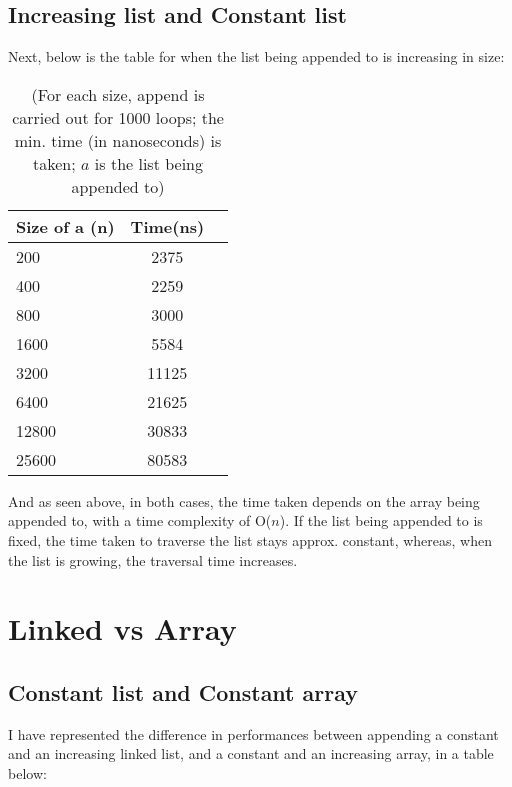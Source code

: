 \documentclass[a4paper,11pt]{article}
\begin{document}
\subsection*{Increasing list and Constant list}

Next, below is the table for when the list being appended to is increasing in size:
\begin{table}[h]
\begin{center}
\begin{tabular}{l|c|c}
\textbf{Size of a (n)} & \textbf{Time(ns)}\\
\hline
  200      &  2375\\
  400      &  2259\\
  800      &  3000\\
  1600      &  5584\\
  3200      &  11125\\
  6400      &  21625\\
  12800      &  30833\\
  25600      &  80583\\
\end{tabular}
\caption{(For each size, append is carried out for 1000 loops; the min. time (in nanoseconds) is taken; $a$ is the list being appended to)}
\label{tab:table1}
\end{center}
\end{table}

 And as seen above, in both cases, the time taken depends on the array being appended to, with a time complexity of O($n$). If the list being appended to is fixed, the time taken to traverse the list stays approx. constant, whereas, when the list is growing, the traversal time increases.


\section*{Linked vs Array}
\subsection*{Constant list and Constant array}

I have represented the difference in performances between appending a constant and an increasing linked list, and a constant and an increasing array, in a table below:
\end{document}
